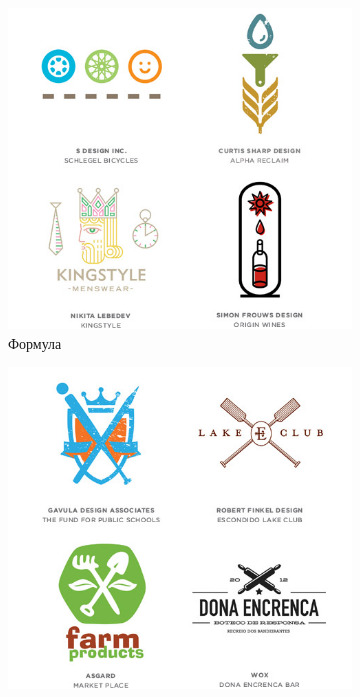 \begin{figure}[h!]
  \centering
  \begin{subfigure}{.45\textwidth}
    \centering
    \includegraphics[width=\linewidth]{images/supplement/logolounge/2013/Formula}
    \caption[]{Формула}
    \label{fig:logolounge:2013:formula}
  \end{subfigure}
  \hfill
  \centering
  \begin{subfigure}{.45\textwidth}
    \centering
    \includegraphics[width=\linewidth]{images/supplement/logolounge/2013/Kresti}

\end{subfigure}
\end{figure}
